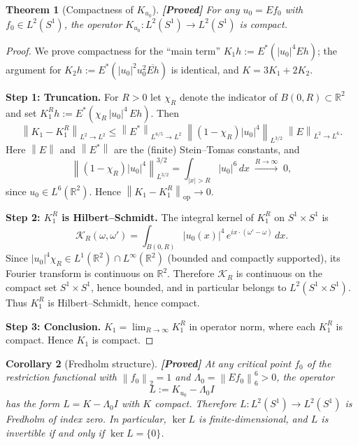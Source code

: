 \documentclass[12pt]{article}
\newtheorem{theorem}{Theorem}[section]
\newtheorem{corollary}[theorem]{Corollary}
\theoremstyle{definition}
\theoremstyle{remark}
\newcommand{\R}{\mathbb{R}}
\newcommand{\norm}[1]{\left\|#1\right\|}
\newcommand{\proven}{\textbf{\color{teal}[Proved]}}
\begin{document}
\begin{theorem}[Compactness of $K_{u_0}$]
  \label{thm:K-compact}
  \proven\quad
  For any $u_0=Ef_0$ with $f_0\in L^2(S^1)$, the operator
  $K_{u_0}:L^2(S^1)\to L^2(S^1)$ is compact.
\end{theorem}

\begin{proof}
  We prove compactness for the ``main term''
  $K_1 h:=E^*(|u_0|^4 Eh)$; the argument for
  $K_2 h:=E^*(|u_0|^2 u_0^2\overline{Eh})$ is identical,
  and $K=3K_1+2K_2$.

  \medskip\noindent
  \textbf{Step 1: Truncation.}
  For $R>0$ let $\chi_R$ denote the indicator of $B(0,R)\subset\R^2$ and
  set $K_1^R h:=E^*(\chi_R\,|u_0|^4\,Eh)$.  Then
  \[
    \norm{K_1-K_1^R}_{L^2\to L^2}
    \leq
    \norm{E^*}_{L^{6/5}\to L^2}
    \;\norm{(1-\chi_R)|u_0|^4}_{L^{3/2}}
    \;\norm{E}_{L^2\to L^6}.
  \]
  Here $\norm{E}$ and $\norm{E^*}$ are the (finite) Stein--Tomas constants,
  and
  \[
    \norm{(1-\chi_R)|u_0|^4}_{L^{3/2}}^{3/2}
    = \int_{|x|>R}|u_0|^6\,dx
    \;\xrightarrow{R\to\infty}\; 0,
  \]
  since $u_0\in L^6(\R^2)$.  Hence $\norm{K_1-K_1^R}_{\mathrm{op}}\to 0$.

  \medskip\noindent
  \textbf{Step 2: $K_1^R$ is Hilbert--Schmidt.}
  The integral kernel of $K_1^R$ on $S^1\times S^1$ is
  \[
    \mathcal K_R(\omega,\omega')
    = \int_{B(0,R)}|u_0(x)|^4\,e^{ix\cdot(\omega'-\omega)}\,dx.
  \]
  Since $|u_0|^4\chi_R\in L^1(\R^2)\cap L^\infty(\R^2)$ (bounded and
  compactly supported), its Fourier transform is continuous on $\R^2$.
  Therefore $\mathcal K_R$ is continuous on the compact set $S^1\times S^1$,
  hence bounded, and in particular belongs to $L^2(S^1\times S^1)$.
  Thus $K_1^R$ is Hilbert--Schmidt, hence compact.

  \medskip\noindent
  \textbf{Step 3: Conclusion.}
  $K_1=\lim_{R\to\infty}K_1^R$ in operator norm, where each $K_1^R$ is
  compact.  Hence $K_1$ is compact.
\end{proof}

\begin{corollary}[Fredholm structure]  \label{cor:fredholm}
  \proven\quad
  At any critical point $f_0$ of the restriction functional with
  $\norm{f_0}_2=1$ and $\Lambda_0=\norm{Ef_0}_6^6>0$, the operator
  \[
    L := K_{u_0} - \Lambda_0 I
  \]
  has the form $L=K-\Lambda_0 I$ with $K$ compact.  Therefore
  $L:L^2(S^1)\to L^2(S^1)$ is Fredholm of index zero.
  In particular, $\ker L$ is finite-dimensional, and $L$ is invertible
  if and only if $\ker L=\{0\}$.
\end{corollary}
\end{document}
